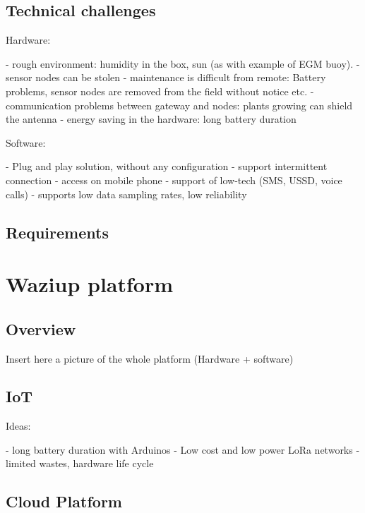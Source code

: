 \documentclass[10pt, conference, compsocconf]{IEEEtran}
\newcommand {\0} {\mathbf 0}
\newcommand {\1} {\mathbf 1}
\begin{document}
\subsection{Technical challenges}

\begin{markdown}
Hardware:

- rough environment: humidity in the box, sun (as with example of EGM buoy).
- sensor nodes can be stolen
- maintenance is difficult from remote: Battery problems, sensor nodes are removed from the field without notice etc.
- communication problems between gateway and nodes: plants growing can shield the antenna
- energy saving in the hardware: long battery duration

Software:

- Plug and play solution, without any configuration
- support intermittent connection
- access on mobile phone
- support of low-tech (SMS, USSD, voice calls)
- supports low data sampling rates, low reliability


\end{markdown}


\subsection{Requirements}

\section{Waziup platform}
\label{iot}

\subsection{Overview}

Insert here a picture of the whole platform (Hardware + software)

\subsection{IoT}

\begin{markdown}
Ideas:

- long battery duration with Arduinos
- Low cost and low power LoRa networks
- limited wastes, hardware life cycle
\end{markdown}
\subsection{Cloud Platform}
\end{document}
